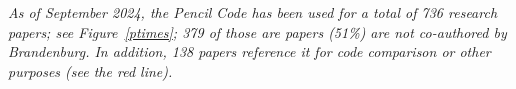 \documentclass[12pt]{article}
\begin{document}
{\em
As of September 2024, the {\sc Pencil Code} has been used for a total of
736 research papers; see Figure~\ref{ptimes};
379 of those are papers (51\%) are not co-authored by Brandenburg. %
In addition, 138 papers reference it for code comparison or other purposes %
(see the red line).
}
\end{document}
